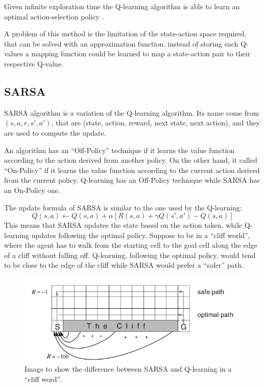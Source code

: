 Given infinite exploration time the Q-learning algorithm is able to learn an optimal action-selection policy \cite{melo2001convergence}.

A problem of this method is the limitation of the state-action space required, that can be solved with an approximation function.
instead of storing each Q-values a mapping function could be learned to map a state-action pair to their respective Q-value.

\subsection{SARSA}
SARSA algorithm \cite{qiang2011reinforcement} is a variation of the Q-learning algorithm.
Its name come from $(s, a, r, s', a')$, that are (state, action, reward, next state, next action), and they are used to compute the update.

An algorithm has an ``Off-Policy'' technique if it learns the value function according to the action derived from another policy. On the other hand, it called ``On-Policy'' if it learns the value function according to the current action derived from the current policy.
Q-learning has an Off-Policy technique while SARSA has an On-Policy one.

The update formula of SARSA is similar to the one used by the Q-learning:
\begin{equation}
    Q(s, a) \leftarrow Q(s, a) + \alpha [R(s, a) + \gamma Q(s', a') - Q(s, a)]
\end{equation}
%
This means that SARSA updates the state based on the action taken, while Q-learning updates following the optimal policy.
Suppose to be in a ``cliff world'', where the agent has to walk from the starting cell to the goal cell along the edge of a cliff without falling off. Q-learning, following the optimal policy, would tend to be close to the edge of the cliff while SARSA would prefer a ``safer'' path.

\begin{figure}[ht]
    \centering
    \includegraphics[scale=0.4]{images/cliff_word.png}
    \caption{Image to show the difference between SARSA and Q-learning in a ``cliff word''.}
\end{figure}

